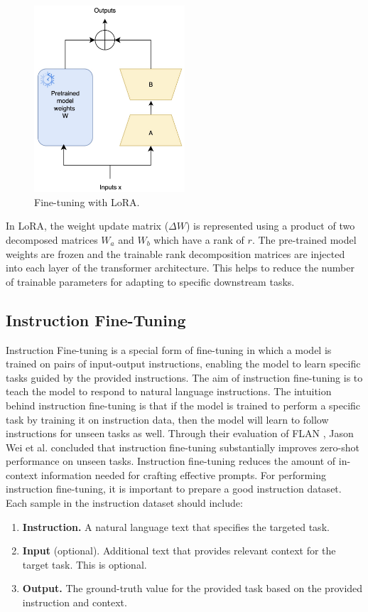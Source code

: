 \begin{figure}[h]
    \centering
    \includegraphics[width=0.5\textwidth]{Figures/literature_review/lora.jpeg} 
    \caption{Fine-tuning with LoRA.}
    \label{fig:LoRA}
\end{figure}

In LoRA, the weight update matrix (\(\Delta W\)) is represented using a product of two decomposed matrices \(W_a\) and \(W_b\) which have a rank of \(r\). The pre-trained model weights are frozen and the trainable rank decomposition matrices are injected into each layer of the transformer architecture. This helps to reduce the number of trainable parameters for adapting to specific downstream tasks. 

\subsection{Instruction Fine-Tuning}
Instruction Fine-tuning \cite{chung2024scaling} is a special form of fine-tuning in which a model is trained on pairs of input-output instructions, enabling the model to learn specific tasks guided by the provided instructions. The aim of instruction fine-tuning is to teach the model to respond to natural language instructions. The intuition behind instruction fine-tuning is that if the model is trained to perform a specific task by training it on instruction data, then the model will learn to follow instructions for unseen tasks as well. Through their evaluation of FLAN \cite{wei2021finetuned}, Jason Wei et al. concluded that instruction fine-tuning substantially improves zero-shot performance on unseen tasks. Instruction fine-tuning reduces the amount of in-context information needed for crafting effective prompts. 
For performing instruction fine-tuning, it is important to prepare a good instruction dataset. Each sample in the instruction dataset should include:
\begin{enumerate}
\item \textbf{Instruction.} A natural language text that specifies the targeted task.
\item \textbf{Input} (optional). Additional text that provides relevant context for the target task. This is optional.
\item \textbf{Output.} The ground-truth value for the provided task based on the provided instruction and context.
\end{enumerate}

